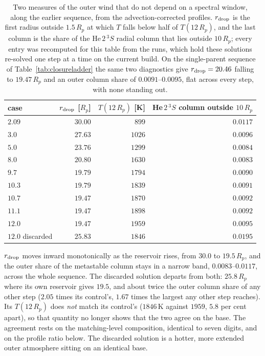 \documentclass[english,a4paper]{my_memo}
\begin{document}
\begin{table}[htbp]\centering
\caption{Two measures of the outer wind that do not depend on a spectral
window, along the earlier sequence, from the advection-corrected profiles.
$r_{\rm drop}$ is the first radius outside $1.5\,R_p$ at which $T$ falls
below half of $T(12\,R_p)$, and the last column is the share of the
He\,$2\,^3S$ radial column that lies outside $10\,R_p$; every entry was
recomputed for this table from the runs, which hold these solutions re-solved
one step at a time on the current build. On the single-parent sequence of
Table~\ref{tab:closureladder} the same two diagnostics give
$r_{\rm drop} = 20.46$ falling to $19.47\,R_p$ and an outer column share of
$0.0091$--$0.0095$, flat across every step, with none standing out.}
\label{tab:outerinherit}
\begin{tabular}{lrrr}
\toprule
case & $r_{\rm drop}$ [$R_p$] & $T(12\,R_p)$ [K] &
He\,$2\,^3S$ column outside $10\,R_p$ \\
\midrule
$2.09$      & $30.00$ & $899$  & $0.0117$ \\
$3.0$       & $27.63$ & $1026$ & $0.0096$ \\
$5.0$       & $23.76$ & $1299$ & $0.0084$ \\
$8.0$       & $20.80$ & $1630$ & $0.0083$ \\
$9.7$       & $19.79$ & $1794$ & $0.0090$ \\
$10.3$      & $19.79$ & $1839$ & $0.0091$ \\
$10.7$      & $19.47$ & $1870$ & $0.0092$ \\
$11.1$      & $19.47$ & $1898$ & $0.0092$ \\
$12.0$      & $19.47$ & $1959$ & $0.0095$ \\
\midrule
$12.0$ discarded & $\mathbf{25.83}$ & $1846$ & $\mathbf{0.0195}$ \\
\bottomrule
\end{tabular}
\end{table}

\noindent $r_{\rm drop}$ moves inward monotonically as the reservoir rises,
from $30.0$ to $19.5\,R_p$, and the outer share of the metastable column
stays in a narrow band, $0.0083$--$0.0117$, across the whole sequence. The
discarded solution departs from both: $25.8\,R_p$ where its own reservoir
gives $19.5$, and about twice the outer column share of any other step
($2.05$ times its control's, $1.67$ times the largest any other step
reaches). Its $T(12\,R_p)$ does \emph{not} match its control's ($1846$\,K
against $1959$, $5.8$ per cent apart), so that quantity no longer shows that
the two agree on the base. The agreement rests on the matching-level
composition, identical to seven digits, and on the profile ratio below. The
discarded solution is a hotter, more extended outer atmosphere sitting on an
identical base.
\end{document}
